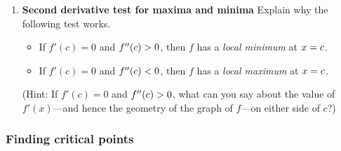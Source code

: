 \begin{enumerate}
\begin{enumerate}
  \item Put all this together to sketch the graph of the second derivative of this function.  Label the values $a$ -- $d$ on your sketch.


\end{enumerate}
\item {\bf Second derivative test for maxima and minima}
Explain why the following test works.
\begin{itemize}
\item  If $f'(c)=0$ and $f''(c) > 0\/$, then $f$ has a {\em local minimum\/} at $x=c\/$.  

\item If $f'(c)=0$ and $f''(c)<0\/$, then $f$ has a {\em local maximum\/} at $x=c\/$.
\end{itemize}
(Hint: If $f'(c)=0$ and $f''(c) > 0\/$, what can you say about the value of $f'(x)$---and hence the geometry of the graph of $f$---on either side of $c$?)

\end{enumerate}
\subsubsection{Finding critical points}
\label{subsubsec:finding-critical-points}



